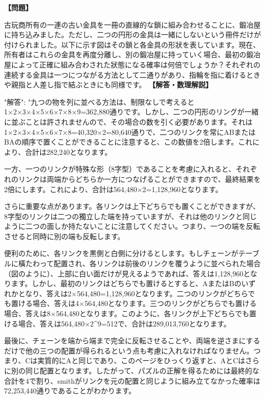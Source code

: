 \documentclass[10pt,a4paper,oneside,openany]{ltjsbook}
\begin{document}
\begin{tcolorbox}[colback=softblue,colframe=primaryblue,title=\textbf{第 282 問：THE ANTIQUARY'S CHAIN.},arc=2mm,boxrule=1pt,breakable]
\textbf{【問題】}\par\vspace{0.3em}
古玩商所有の一連の古い金具を一冊の直線的な鎖に組み合わせることに、鍛冶屋に持ち込みました。ただし、二つの円形の金具は一緒にしないという冊件だけが付けられました。以下に示す図はその鎖と各金具の形狀を表しています。現在、所有者はこれらの金具を再度分離し、別の鍛冶屋に持っていく場合、最初の鍛冶屋によって正確に組み合わされた狀態になる確率は何倍でしょうか？それぞれの連続する金具は一つにつながる方法として二通りがあり、指輪を指に着けるときや親指と人差し指で結ぶときにも同様です。
\tcblower
\textbf{【解答・数理解説】}\par\vspace{0.3em}
{
"解答": "九つの物を列に並べる方法は、制限なしで考えると1×2×3×4×5×6×7×8×9=362,880通りです。しかし、二つの円形のリングが一緒に並ぶことは許されませんので、その場合の数を引く必要があります。それは1×2×3×4×5×6×7×8=40,320×2=80,640通りで、二つのリンクを常にABまたはBAの順序で置くことができることに注意すると、この数値を2倍します。これにより、合計は282,240となります。

一方、一つのリンクが特殊な形（8字型）であることを考慮に入れると、それぞれのリンクは両端からどちらか一方につなげることができますので、最終結果を2倍にします。これにより、合計は564,480×2=1,128,960となります。

さらに重要な点があります。各リンクは上下どちらでも置くことができますが、8字型のリンクは二つの獨立した端を持っていますが、それは他のリンクと同じように二つの面しか持たないことに注意してください。つまり、一つの端を反転させると同時に別の端も反転します。

便利のために、各リンクを黒側と白側に分けるとします。もしチェーンがテーブルに橫たわって配置され、各リンクは前後のリンクを覆うように並べられた場合（図のように）、上部に白い面だけが見えるようであれば、答えは1,128,960となります。しかし、最初のリンクはどちらでも置けるとすると、AまたはBのいずれかとなり、答えは2×564,480=1,128,960となります。二つのリンクがどちらでも置ける場合、答えは4×564,480となります。三つのリンクがどちらでも置ける場合、答えは8×564,480となります。このように、各リンクが上下どちらでも置ける場合、答えは564,480×2\textasciicircum{}9=512で、合計は289,013,760となります。

最後に、チェーンを端から端まで完全に反転させることや、両端を逆さまにするだけで他の三つの配置が得られるという点も考慮に入れなければなりません。つまり、Cは実質的にAと同じであり、このページをひっくり返すと、AとCはさらに別の同じ配置となります。したがって、パズルの正解を得るためには最終的な合計を4で割り、smithがリンクを元の配置と同じように組み立てなかった確率は72,253,440通りであることがわかります。

}
\end{tcolorbox}
\end{document}
